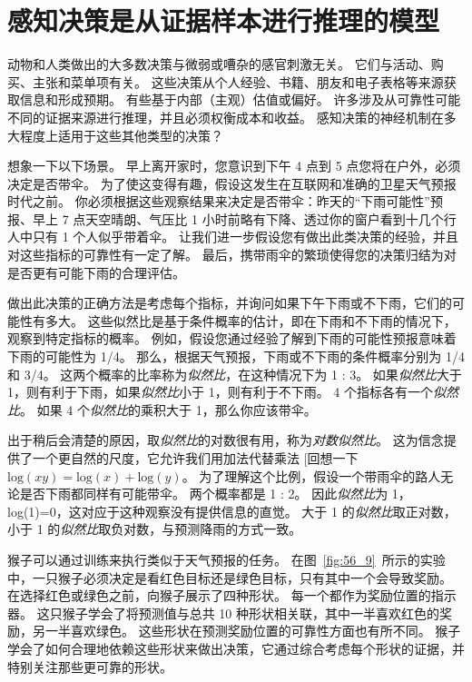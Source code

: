 \section{感知决策是从证据样本进行推理的模型}

动物和人类做出的大多数决策与微弱或嘈杂的感官刺激无关。
它们与活动、购买、主张和菜单项有关。
这些决策从个人经验、书籍、朋友和电子表格等来源获取信息和形成预期。
有些基于内部（主观）估值或偏好。
许多涉及从可靠性可能不同的证据来源进行推理，并且必须权衡成本和收益。
感知决策的神经机制在多大程度上适用于这些其他类型的决策？


想象一下以下场景。
早上离开家时，您意识到下午 4 点到 5 点您将在户外，必须决定是否带伞。
为了使这变得有趣，假设这发生在互联网和准确的卫星天气预报时代之前。
你必须根据这些观察结果来决定是否带伞：昨天的“下雨可能性”预报、早上 7 点天空晴朗、气压比 1 小时前略有下降、透过你的窗户看到十几个行人中只有 1 个人似乎带着伞。
让我们进一步假设您有做出此类决策的经验，并且对这些指标的可靠性有一定了解。
最后，携带雨伞的繁琐使得您的决策归结为对是否更有可能下雨的合理评估。


做出此决策的正确方法是考虑每个指标，并询问如果下午下雨或不下雨，它们的可能性有多大。
这些似然比是基于条件概率的估计，即在下雨和不下雨的情况下，观察到特定指标的概率。
例如，假设您通过经验了解到下雨的可能性预报意味着下雨的可能性为 1/4。
那么，根据天气预报，下雨或不下雨的条件概率分别为 1/4 和 3/4。
这两个概率的比率称为\textit{似然比}，在这种情况下为 1 : 3。
如果\textit{似然比}大于 1，则有利于下雨，如果\textit{似然比}小于 1，则有利于不下雨。
4 个指标各有一个\textit{似然比}。
如果 4 个\textit{似然比}的乘积大于 1，那么你应该带伞。


出于稍后会清楚的原因，取\textit{似然比}的对数很有用，称为\textit{对数似然比}。
这为信念提供了一个更自然的尺度，它允许我们用加法代替乘法 [回想一下$\text{log}(xy) = \text{log}(x) + \text{log}(y) $。
为了理解这个比例，假设一个带雨伞的路人无论是否下雨都同样有可能带伞。
两个概率都是 1 : 2。
因此\textit{似然比}为 1，log(1)=0，这对应于这种观察没有提供信息的直觉。
大于 1 的\textit{似然比}取正对数，小于 1 的\textit{似然比}取负对数，与预测降雨的方式一致。


猴子可以通过训练来执行类似于天气预报的任务。
在图~\ref{fig:56_9}~所示的实验中，一只猴子必须决定是看红色目标还是绿色目标，只有其中一个会导致奖励。
在选择红色或绿色之前，向猴子展示了四种形状。
每一个都作为奖励位置的指示器。
这只猴子学会了将预测值与总共 10 种形状相关联，其中一半喜欢红色的奖励，另一半喜欢绿色。
这些形状在预测奖励位置的可靠性方面也有所不同。
猴子学会了如何合理地依赖这些形状来做出决策，它通过综合考虑每个形状的证据，并特别关注那些更可靠的形状。


